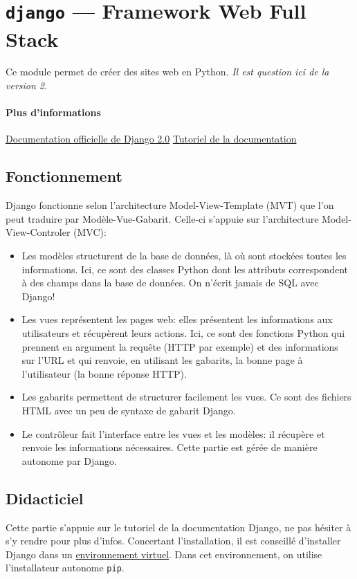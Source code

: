 \documentclass[a4paper, 10pt]{article}
\begin{document}
\section{\texttt{django} --- Framework Web Full Stack}
Ce  module permet de créer des sites web en Python. \emph{Il est question ici de la version 2}.
\paragraph{Plus d'informations} \href{https://docs.djangoproject.com/fr/2.0/}{Documentation officielle de Django 2.0} \href{https://docs.djangoproject.com/fr/2.0/intro/}{Tutoriel de la documentation}

\subsection{Fonctionnement}

Django fonctionne selon l'architecture Model-View-Template (MVT) que l'on peut traduire par Modèle-Vue-Gabarit. Celle-ci s’appuie sur l'architecture Model-View-Controler (MVC):
\begin{itemize}
	\item Les modèles structurent de la base de données, là où sont stockées toutes les informations. Ici, ce sont des classes Python dont les attributs correspondent à des champs dans la base de données. On n'écrit jamais de SQL avec Django!
	\item Les vues représentent les pages web: elles présentent les informations aux utilisateurs et récupèrent leurs actions. Ici, ce sont des fonctions Python qui prennent en argument la requête (HTTP par exemple) et des informations sur l’URL et qui renvoie, en utilisant les gabarits, la bonne page à l'utilisateur (la bonne réponse HTTP).
	\item Les gabarits permettent de structurer facilement les vues. Ce sont des fichiers HTML avec un peu de syntaxe de gabarit Django.
	\item Le contrôleur fait l'interface entre les vues et les modèles: il récupère et renvoie les informations nécessaires. Cette partie est gérée de manière autonome par Django.
\end{itemize}

\subsection{Didacticiel}
Cette partie s'appuie sur le tutoriel de la documentation Django, ne pas hésiter à s'y rendre pour plus d'infos. Concertant l'installation, il est conseillé d'installer Django dans un \hyperref[virtualenv]{environnement virtuel}. Dans cet environnement, on utilise l'installateur autonome \texttt{pip}.
\end{document}

